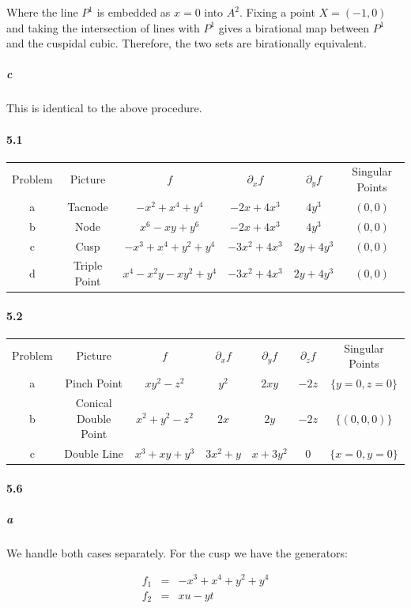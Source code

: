 \documentclass{article}
\begin{document}
Where the line $P^1$ is embedded as $x=0$ into $A^2$.  Fixing a point $X = (-1, 0)$ and taking the intersection of lines with $P^1$ gives a birational map between $P^1$ and the cuspidal cubic.  Therefore, the two sets are birationally equivalent.

\subparagraph{c}
This is identical to the above procedure.


\paragraph{5.1}

\begin{tabular}[h]{cccccc}
Problem & Picture & $f$ & $\partial_x f$ & $\partial_y f$ & Singular Points \\
a & Tacnode & $-x^2 + x^4 + y^4$ & $-2x + 4x^3$ & $4y^3$ & $(0,0)$ \\
b & Node & $x^6 - xy + y^6$ & $-2x + 4x^3$ & $4y^3$ & $(0,0)$ \\
c & Cusp & $-x^3 + x^4 + y^2 + y^4$ & $-3x^2 + 4x^3$ & $2y + 4y^3$ & $(0,0)$ \\
d & Triple Point & $x^4 - x^2 y  - xy^2 + y^4$ & $-3x^2 + 4x^3$ & $2y+4y^3$ & $(0,0)$ \\
\end{tabular}

\paragraph{5.2}

\begin{tabular}[h]{ccccccc}
Problem & Picture & $f$ & $\partial_x f$ & $\partial_y f$ & $\partial_z f$ & Singular Points \\
a & Pinch Point & $x y^2 - z^2$ & $y^2$ & $2xy$ & $-2z$ & $\{ y=0, z=0 \}$ \\
b & Conical Double Point & $x^2 + y^2 - z^2$ & $2x$ & $2y$ & $-2z$ & $\{ (0,0,0) \}$ \\
c & Double Line & $x^3 + xy +y^3$ & $3x^2 + y$ & $x+3y^2$ & $0$ & $\{ x=0, y=0 \}$ \\
\end{tabular}

\paragraph{5.6}

\subparagraph{a}
We handle both cases separately.  For the cusp we have the generators:

\begin{eqnarray*}
f_1 & = & -x^3 + x^4 + y^2 + y^4 \\
f_2 & = & x u - y t
\end{eqnarray*}
\end{document}
